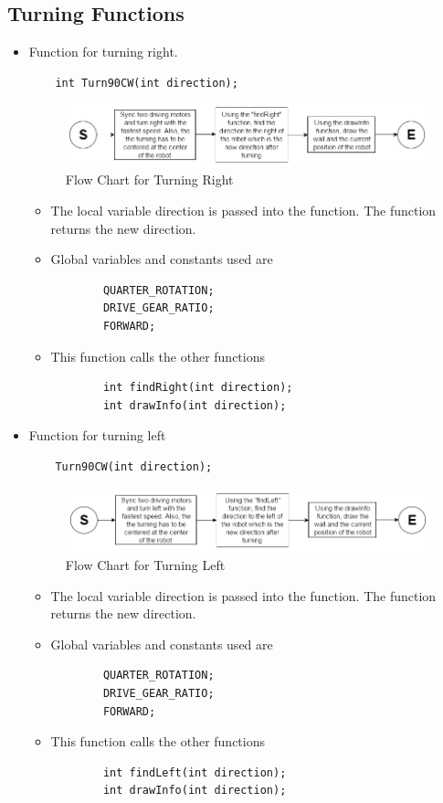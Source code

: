 \documentclass[11pt]{article}
\begin{document}

\subsection{Turning Functions}
\begin{itemize}
\item Function for turning right.
\begin{verbatim}
	int Turn90CW(int direction);
\end{verbatim}
\begin{figure}[htp]
\centering
\includegraphics[scale=0.6]{images/Software_Flowchart/Turning_Right.png}
\caption{Flow Chart for Turning Right}
\label{}
\end{figure}
	\begin{itemize}
	\item The local variable direction is passed into the function. The function returns the new direction.
	\item Global variables and constants used are
	\begin{verbatim}
		QUARTER_ROTATION;
		DRIVE_GEAR_RATIO;
		FORWARD;
	\end{verbatim}
	\item This function calls the other functions
	\begin{verbatim}
		int findRight(int direction);
		int drawInfo(int direction);
	\end{verbatim}
	\end{itemize}
\item Function for turning left 
\begin{verbatim}
	Turn90CW(int direction);
\end{verbatim}
\begin{figure}[htp]
\centering
\includegraphics[scale=0.60]{images/Software_Flowchart/Turning_Left.png}
\caption{Flow Chart for Turning Left}
\label{}
\end{figure}
	\begin{itemize}
	\item The local variable direction is passed into the function. The function returns the new direction.
	\item Global variables and constants used are
	\begin{verbatim}
		QUARTER_ROTATION;
		DRIVE_GEAR_RATIO;
		FORWARD;
	\end{verbatim}
	\item This function calls the other functions
	\begin{verbatim}
		int findLeft(int direction);
		int drawInfo(int direction);
	\end{verbatim}
	\end{itemize}
\end{itemize}
\end{document}
